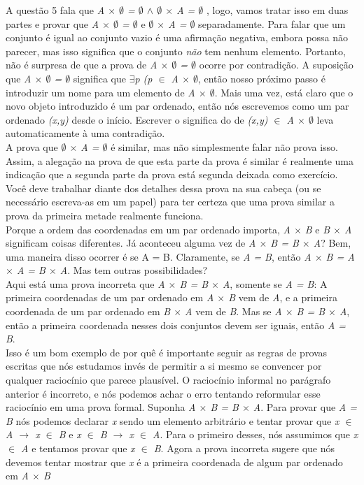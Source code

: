 \indent	A questão 5 fala que \textit{A $\times$ $\emptyset$ = $\emptyset$ $\wedge$ $\emptyset$ $\times$ A = $\emptyset$ }, logo, vamos tratar isso em duas partes e provar que \textit{A $\times$ $\emptyset$ = $\emptyset$ } e \textit{$\emptyset$  $\times$ A = $\emptyset$} separadamente. Para falar que um conjunto é igual ao conjunto vazio é uma afirmação negativa, embora possa não parecer, mas isso significa que o conjunto \textit{não} tem nenhum elemento. Portanto, não é surpresa de que a prova de \textit{A $\times$ $\emptyset$ = $\emptyset$ } ocorre por contradição. A suposição que \textit{A $\times$ $\emptyset$ = $\emptyset$} significa que $\exists$\textit{p (p $\in$ A $\times$ $\emptyset$}, então nosso próximo passo é introduzir um nome para um elemento de \textit{A $\times$ $\emptyset$}. Mais uma vez, está claro que o novo objeto introduzido é um par ordenado, então nós  escrevemos como um par ordenado \textit{(x,y)} desde o início. Escrever o significa do de \textit{(x,y) $\in$  A $\times$ $\emptyset$} leva automaticamente à uma contradição. 
 \\
\indent A prova que \textit{$\emptyset$ $\times$ A = $\emptyset$} é similar, mas não simplesmente falar não prova isso. Assim, a alegação na prova de que esta parte da prova é similar é realmente uma indicação que a segunda parte da prova está segunda deixada como exercício. Você deve trabalhar diante dos detalhes dessa prova na sua cabeça (ou se necessário escreva-as em um papel) para ter certeza que uma prova similar a prova da primeira metade realmente funciona. 
 \\
\indent Porque a ordem das coordenadas em um par ordenado importa, \textit{A $\times$  B} e \textit{B $\times$ A } significam coisas diferentes.  Já aconteceu alguma vez de \textit{A $\times$ B = B $\times$ A}? Bem, uma maneira disso ocorrer é se A = B. Claramente, se \textit{A = B}, então \textit{A $\times$ B = A $\times$ A = B $\times$ A}. Mas tem outras possibilidades?
    \\
\indent  Aqui está uma prova incorreta que \textit{A $\times$ B = B $\times$ A}, somente se \textit{A = B}: A primeira coordenadas de um par ordenado em \textit{A $\times$ B} vem de \textit{A}, e a primeira coordenada de um par ordenado em \textit{B $\times$ A} vem de \textit{B}. Mas se \textit{A $\times$ B = B $\times$ A}, então a primeira coordenada nesses dois conjuntos devem ser iguais, então \textit{A = B}.
  \\
\indent  Isso é um bom exemplo de por quê é importante seguir as regras de provas escritas que nós estudamos invés de permitir a si mesmo se convencer por qualquer raciocínio que parece plausível. O raciocínio informal no parágrafo anterior é incorreto, e nós podemos achar o erro tentando reformular esse raciocínio em uma prova formal. Suponha \textit{A $\times$ B = B $\times$ A}. Para provar que \textit{A = B} nós podemos declarar \textit{x} sendo um elemento arbitrário e tentar provar que \textit{x $\in$ A $\rightarrow$ x $\in$ B}  e \textit{x $\in$ B $\rightarrow$ x $\in$ A}. Para o primeiro desses, nós assumimos que \textit{x $\in$ A} e tentamos provar que \textit{x $\in$ B}. Agora a prova incorreta sugere que nós devemos tentar mostrar que \textit{x} é a primeira coordenada de algum par ordenado em \textit{A $\times$ B}
